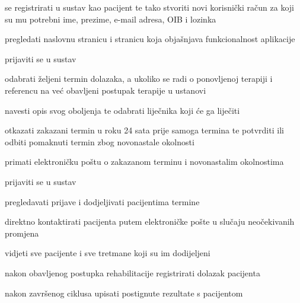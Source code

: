 			
			\begin{packed_enum}
				\item  {}
				
				\begin{packed_enum}
					
					\item se registrirati u sustav kao pacijent te tako stvoriti novi korisnički račun za koji su mu potrebni ime, prezime, e-mail adresa, OIB i lozinka
					\item pregledati naslovnu stranicu i stranicu koja objašnjava funkcionalnost aplikacije
					
					
				\end{packed_enum}
			
				\item  {}
				
				\begin{packed_enum}
					
					\item prijaviti se u sustav
					\item odabrati željeni termin dolazaka, a ukoliko se radi o ponovljenoj terapiji i referencu na već obavljeni postupak terapije u ustanovi
					\item navesti opis svog oboljenja te odabrati liječnika koji će ga liječiti
					\item otkazati zakazani termin u roku 24 sata prije samoga termina te potvrditi ili odbiti pomaknuti termin zbog novonastale okolnosti
					\item primati elektroničku poštu o zakazanom terminu i novonastalim okolnostima
					
				\end{packed_enum}
			
			
			\item  {}
			
			\begin{packed_enum}
				
				\item prijaviti se u sustav
				\item pregledavati prijave i dodjeljivati pacijentima termine
				\item direktno kontaktirati pacijenta putem elektroničke pošte u slučaju neočekivanih promjena
				\item vidjeti sve pacijente i sve tretmane koji su im dodijeljeni
				\item nakon obavljenog postupka rehabilitacije registrirati dolazak pacijenta
				\item nakon završenog ciklusa upisati postignute rezultate s pacijentom
				

\end{packed_enum}
\end{packed_enum}
